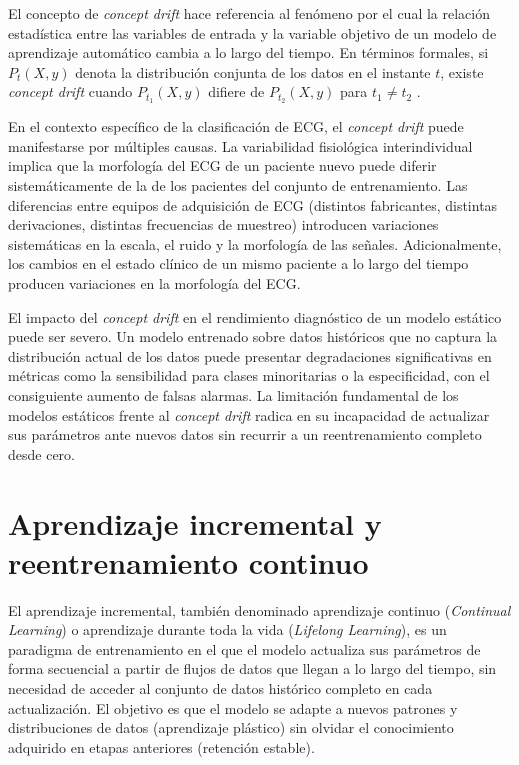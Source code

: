 El concepto de \textit{concept drift} hace referencia al fenómeno por el cual la relación estadística entre las variables de entrada y la variable objetivo de un modelo de aprendizaje automático cambia a lo largo del tiempo. En términos formales, si $P_t(X, y)$ denota la distribución conjunta de los datos en el instante $t$, existe \textit{concept drift} cuando $P_{t_1}(X, y)$ difiere de $P_{t_2}(X, y)$ para $t_1 \neq t_2$ \cite{Reshad2025}.

En el contexto específico de la clasificación de ECG, el \textit{concept drift} puede manifestarse por múltiples causas. La variabilidad fisiológica interindividual implica que la morfología del ECG de un paciente nuevo puede diferir sistemáticamente de la de los pacientes del conjunto de entrenamiento. Las diferencias entre equipos de adquisición de ECG (distintos fabricantes, distintas derivaciones, distintas frecuencias de muestreo) introducen variaciones sistemáticas en la escala, el ruido y la morfología de las señales. Adicionalmente, los cambios en el estado clínico de un mismo paciente a lo largo del tiempo producen variaciones en la morfología del ECG.

El impacto del \textit{concept drift} en el rendimiento diagnóstico de un modelo estático puede ser severo. Un modelo entrenado sobre datos históricos que no captura la distribución actual de los datos puede presentar degradaciones significativas en métricas como la sensibilidad para clases minoritarias o la especificidad, con el consiguiente aumento de falsas alarmas. La limitación fundamental de los modelos estáticos frente al \textit{concept drift} radica en su incapacidad de actualizar sus parámetros ante nuevos datos sin recurrir a un reentrenamiento completo desde cero.

\section{Aprendizaje incremental y reentrenamiento continuo}

El aprendizaje incremental, también denominado aprendizaje continuo (\textit{Continual Learning}) o aprendizaje durante toda la vida (\textit{Lifelong Learning}), es un paradigma de entrenamiento en el que el modelo actualiza sus parámetros de forma secuencial a partir de flujos de datos que llegan a lo largo del tiempo, sin necesidad de acceder al conjunto de datos histórico completo en cada actualización. El objetivo es que el modelo se adapte a nuevos patrones y distribuciones de datos (aprendizaje plástico) sin olvidar el conocimiento adquirido en etapas anteriores (retención estable).

